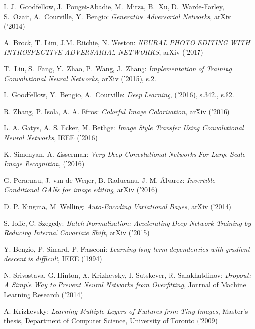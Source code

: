 \begin{thebibliography}{99} %

   I. J.~Goodfellow, J.~Pouget-Abadie, M.~Mirza, B.~Xu, D.~Warde-Farley, S.~Ozair, A.~Courville, Y.~Bengio:
  \emph{Generative Adversarial Networks}, arXiv ('2014)

   A. Brock, T. Lim, J.M. Ritchie,
  N. Weston:
  \emph{NEURAL PHOTO EDITING WITH INTROSPECTIVE ADVERSARIAL NETWORKS}, arXiv ('2017)

   T.~Liu, S.~Fang, Y.~Zhao, P.~Wang, J.~Zhang:
  \emph{Implementation of Training Convolutional Neural Networks}, arXiv ('2015), s.2.

   I.~Goodfellow, Y.~Bengio, A.~Courville:
  \emph{Deep Learning}, ('2016), s.342., s.82.

   R. Zhang, P. Isola, A. A. Efros:
  \emph{Colorful Image Colorization}, arXiv ('2016)

   L. A. Gatys, A. S. Ecker, M. Bethge:
  \emph{Image Style Transfer Using Convolutional Neural Networks}, IEEE ('2016)

   K. Simonyan, A. Zisserman:
  \emph{Very Deep Convolutional Networks For Large-Scale Image Recognition}, ('2016)

   G. Perarnau, J. van de Weijer, B. Raducanu, J. M. Álvarez:
  \emph{Invertible Conditional GANs for image editing}, arXiv ('2016)

   D. P. Kingma, M. Welling:
  \emph{Auto-Encoding Variational Bayes}, arXiv ('2014)

   S. Ioffe, C. Szegedy:
  \emph{Batch Normalization: Accelerating Deep Network Training by Reducing
  Internal Covariate Shift}, arXiv ('2015)

   Y. Bengio, P. Simard, P. Frasconi:
  \emph{Learning long-term dependencies with gradient descent is difficult},
  IEEE ('1994)

   N. Srivastava, G. Hinton, A. Krizhevsky,
  I. Sutskever, R. Salakhutdinov:
  \emph{Dropout: A Simple Way to Prevent Neural Networks from Overfitting},
  Journal of Machine Learning Research ('2014)

   A. Krizhevsky:
  \emph{Learning Multiple Layers of Features from Tiny Images},
  Master’s thesis, Department of Computer Science, University of Toronto ('2009)


\end{thebibliography}
